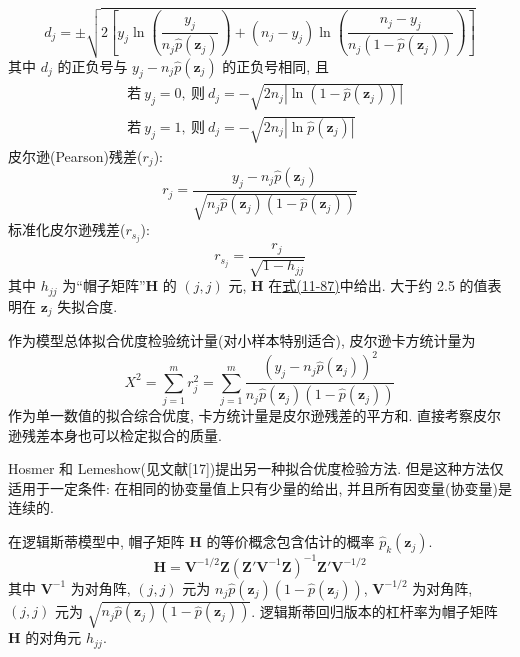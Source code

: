 
\[
d_j=\pm\sqrt{2\left[y_j\ln\left(\frac{y_j}{n_j\hat{p}(\mathbf{z}_j)}\right)+(n_j-y_j)\ln\left(\frac{n_j-y_j}{n_j(1-\hat{p}(\mathbf{z}_j))}\right)\right]}
\]
其中 $d_j$ 的正负号与 $y_j-n_j\hat{p}(\mathbf{z}_j)$ 的正负号相同, 且
\label{eq:11-83}
\begin{equation}
\begin{aligned}
&\text{若}\ y_j=0,\ \text{则}\ d_j=-\sqrt{2n_j\left|\ln(1-\hat{p}(\mathbf{z}_j))\right|}\\
&\text{若}\ y_j=1,\ \text{则}\ d_j=-\sqrt{2n_j\left|\ln\hat{p}(\mathbf{z}_j)\right|}
\end{aligned}
\tag{11-83}
\end{equation}
皮尔逊(Pearson)残差($r_j$):
\label{eq:11-84}
\begin{equation}
r_j=\frac{y_j-n_j\hat{p}(\mathbf{z}_j)}{\sqrt{n_j\hat{p}(\mathbf{z}_j)(1-\hat{p}(\mathbf{z}_j))}}
\tag{11-84}
\end{equation}
标准化皮尔逊残差($r_{s_j}$):
\label{eq:11-85}
\begin{equation}
r_{s_j}=\frac{r_j}{\sqrt{1-h_{jj}}}
\tag{11-85}
\end{equation}
其中 $h_{jj}$ 为“帽子矩阵”$\mathbf{H}$ 的 $(j,j)$ 元, $\mathbf{H}$ 在\hyperref[eq:11-87]{式(11-87)}中给出. 大于约 2.5 的值表明在 $\mathbf{z}_j$ 失拟合度.

作为模型总体拟合优度检验统计量(对小样本特别适合), 皮尔逊卡方统计量为
\label{eq:11-86}
\begin{equation}
X^2=\sum_{j=1}^{m}r_j^2=\sum_{j=1}^{m}\frac{(y_j-n_j\hat{p}(\mathbf{z}_j))^2}{n_j\hat{p}(\mathbf{z}_j)(1-\hat{p}(\mathbf{z}_j))}
\tag{11-86}
\end{equation}
作为单一数值的拟合综合优度, 卡方统计量是皮尔逊残差的平方和. 直接考察皮尔逊残差本身也可以检定拟合的质量.

Hosmer 和 Lemeshow(见文献[17])提出另一种拟合优度检验方法. 但是这种方法仅适用于一定条件: 在相同的协变量值上只有少量的给出, 并且所有因变量(协变量)是连续的.

\quad 在逻辑斯蒂模型中, 帽子矩阵 $\mathbf{H}$ 的等价概念包含估计的概率 $\hat{p}_k(\mathbf{z}_j)$.
\label{eq:11-87}
\begin{equation}
\mathbf{H}=\mathbf{V}^{-1/2}\mathbf{Z}(\mathbf{Z}'\mathbf{V}^{-1}\mathbf{Z})^{-1}\mathbf{Z}'\mathbf{V}^{-1/2}
\tag{11-87}
\end{equation}
其中 $\mathbf{V}^{-1}$ 为对角阵, $(j,j)$ 元为 $n_j\hat{p}(\mathbf{z}_j)(1-\hat{p}(\mathbf{z}_j))$, $\mathbf{V}^{-1/2}$ 为对角阵, $(j,j)$ 元为 $\sqrt{n_j\hat{p}(\mathbf{z}_j)(1-\hat{p}(\mathbf{z}_j))}$. 逻辑斯蒂回归版本的杠杆率为帽子矩阵 $\mathbf{H}$ 的对角元 $h_{jj}$.

